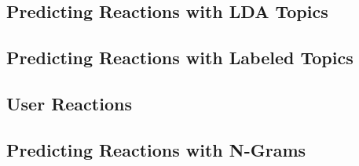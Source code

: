 
\subsection{Predicting Reactions with LDA Topics}


\subsection{Predicting Reactions with Labeled Topics}


\subsection{User Reactions}


\subsection{Predicting Reactions with N-Grams}

